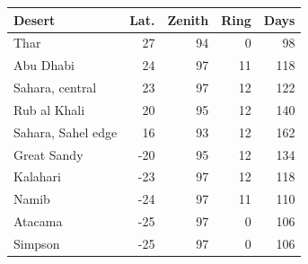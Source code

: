 \begin{tabular}{lrrrr}
\toprule
Desert & Lat. & Zenith & Ring & Days \\
\midrule
Thar & 27 & 94 & 0 & 98 \\
Abu Dhabi & 24 & 97 & 11 & 118 \\
Sahara, central & 23 & 97 & 12 & 122 \\
Rub al Khali & 20 & 95 & 12 & 140 \\
Sahara, Sahel edge & 16 & 93 & 12 & 162 \\
Great Sandy & -20 & 95 & 12 & 134 \\
Kalahari & -23 & 97 & 12 & 118 \\
Namib & -24 & 97 & 11 & 110 \\
Atacama & -25 & 97 & 0 & 106 \\
Simpson & -25 & 97 & 0 & 106 \\
\bottomrule
\end{tabular}